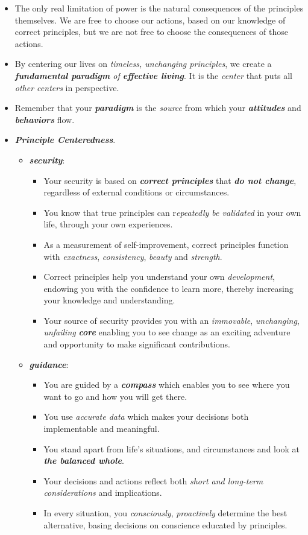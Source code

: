 \documentclass[11pt]{article}
\begin{document}
\begin{itemize}
\item The only real limitation of power is the natural consequences of the principles themselves. We are free to choose our actions, based on our knowledge of correct principles, but we are not free to choose the consequences of those actions.

\item By centering our lives on \emph{timeless, unchanging principles}, we create a \emph{\textbf{fundamental paradigm} of \textbf{effective living}}. It is the \emph{center} that puts all \emph{other centers} in perspective.

\item Remember that your \emph{\textbf{paradigm}} is the \emph{source} from which your \emph{\textbf{attitudes}} and \emph{\textbf{behaviors}} flow.

\item \emph{\textbf{Principle Centeredness}}.
\begin{itemize}
\item \emph{\textbf{security}}: 
\begin{itemize}
\item Your security is based on \emph{\textbf{correct principles}} that \emph{\textbf{do not change}}, regardless of external conditions or circumstances.
\item You know that true principles can r\emph{epeatedly be validated} in your own life, through your own experiences.
\item As a measurement of self-improvement, correct principles function with \emph{exactness}, \emph{consistency}, \emph{beauty} and \emph{strength}.
\item Correct principles help you understand your own \emph{development}, endowing you with the confidence to learn more, thereby increasing your knowledge and understanding.
\item Your source of security provides you with an \emph{immovable}, \emph{unchanging}, \emph{unfailing} \textbf{\emph{core}} enabling you to see change as an exciting adventure and opportunity to make significant contributions.
\end{itemize}
  
\item \emph{\textbf{guidance}}:
\begin{itemize}
\item You are guided by a \emph{\textbf{compass}} which enables you to see where you want to go and how you will get there.
\item You use \emph{accurate data} which makes your decisions both implementable and meaningful. 
\item You stand apart from life's situations, and circumstances and look at \emph{\textbf{the balanced whole}}. 
\item Your decisions and actions reflect both \emph{short and long-term considerations} and implications.
\item In every situation, you \emph{consciously}, \emph{proactively} determine the best alternative, basing decisions on conscience educated by principles.
\end{itemize}
  

\end{itemize}
\end{itemize}
\end{document}
